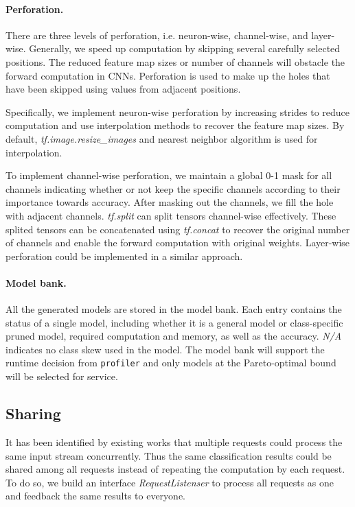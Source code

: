 \documentclass[pageno]{jpaper}
\begin{document}
\paragraph{Perforation.}
There are three levels of perforation, i.e. neuron-wise, channel-wise, and layer-wise. Generally, we speed up computation by skipping several carefully selected positions. The reduced feature map sizes or number of channels will obstacle the forward computation in CNNs. Perforation is used to make up the holes that have been skipped using values from adjacent positions. 

Specifically, we implement neuron-wise perforation by increasing strides to reduce computation and use interpolation methods to recover the feature map sizes. By default, \textit{tf.image.resize\_images} and nearest neighbor algorithm is used for interpolation. 

To implement channel-wise perforation, we maintain a global 0-1 mask for all channels indicating whether or not keep the specific channels according to their importance towards accuracy. After masking out the channels, we fill the hole with adjacent channels. \textit{tf.split} can split tensors channel-wise effectively. These splited tensors can be concatenated using \textit{tf.concat} to recover the original number of channels and enable the forward computation with original weights. Layer-wise perforation could be implemented in a similar approach.




\paragraph{Model bank.}
All the generated models are stored in the model bank. Each entry contains the status of a single model, including whether it is a general model or class-specific pruned model, required computation and memory, as well as the accuracy. \textit{N/A} indicates no class skew used in the model. The model bank will support the runtime decision from \texttt{profiler} and only models at the Pareto-optimal bound will be selected for service.



\subsection{Sharing}
It has been identified by existing works \cite{guo2018potluck, jiang2018mainstream} that multiple requests could process the same input stream concurrently. Thus the same classification results could be shared among all requests instead of repeating the computation by each request. To do so, we build an interface \textit{RequestListenser} to process all requests as one and feedback the same results to everyone. 
\end{document}
